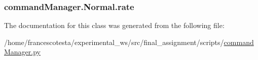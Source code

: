 \subsubsection[{\texorpdfstring{rate}{rate}}]{\setlength{\rightskip}{0pt plus 5cm}command\+Manager.\+Normal.\+rate\hspace{0.3cm}{\ttfamily [static]}}\hypertarget{classcommandManager_1_1Normal_a32e84cf5ac08ffeb9cb1a21d4b484a32}{}\label{classcommandManager_1_1Normal_a32e84cf5ac08ffeb9cb1a21d4b484a32}


The documentation for this class was generated from the following file\+:\begin{DoxyCompactItemize}
\item 
/home/francescotesta/experimental\+\_\+ws/src/final\+\_\+assignment/scripts/\hyperlink{commandManager_8py}{command\+Manager.\+py}\end{DoxyCompactItemize}
